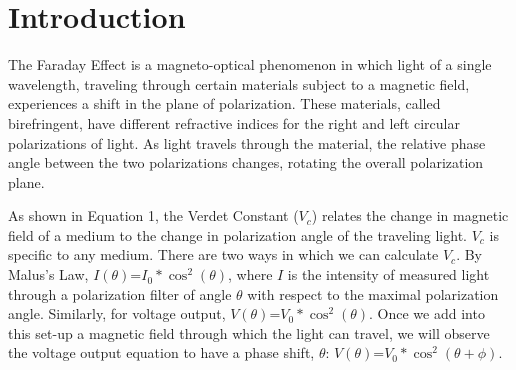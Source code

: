\documentclass[prb,preprint]{revtex4-1}
\begin{document}
\section{Introduction} 

{The Faraday Effect is a magneto-optical phenomenon in which light of a single wavelength, traveling through certain materials subject to a magnetic field, experiences a shift in the plane of polarization. These materials, called birefringent, have different refractive indices for the right and left circular polarizations of light. As light travels through the material, the relative phase angle between the two polarizations changes, rotating the overall polarization plane.

As shown in Equation 1, the Verdet Constant ($V_{c}$) relates the change in magnetic field of a medium to the change in polarization angle of the traveling light.  $V_{c}$ is specific to any medium.  There are two ways in which we can calculate $V_{c}$.  By Malus's Law, $I(\theta)$=$I_{0}*\cos^{2}(\theta)$, where $I$ is the intensity of measured light through a polarization filter of angle $\theta$ with respect to the maximal polarization angle.  Similarly, for voltage output, $V(\theta)$=$V_{0}*\cos^{2}(\theta)$.  Once we add into this set-up a magnetic field through which the light can travel, we will observe the voltage output equation to have a phase shift, $\theta$:  $V(\theta)$=$V_{0}*\cos^{2}(\theta+\phi)$.
}
\end{document}
